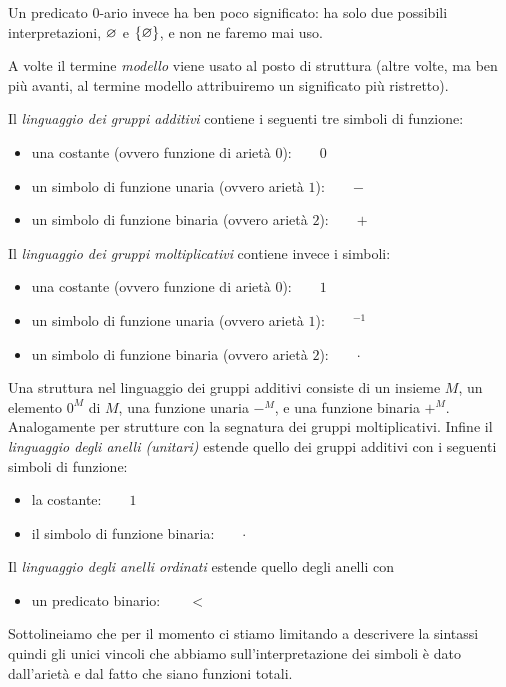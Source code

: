Un predicato $0$-ario invece ha ben poco significato: ha solo due possibili interpretazioni, $\varnothing$ e $\{\varnothing\}$, e non ne faremo mai uso.

A volte il termine \emph{modello\/} viene usato al posto di struttura (altre volte, ma ben pi\`u avanti, al termine modello attribuiremo un significato pi\`u ristretto).

\begin{example}\label{LgaLgmLau}
Il \emph{linguaggio dei gruppi additivi\/} contiene i seguenti tre simboli di funzione:
\begin{itemize}
\item una costante (ovvero funzione di ariet\`a $0$):\ \ \ \  $0$
\item un simbolo di funzione unaria (ovvero ariet\`a $1$):\ \ \ \   $-$
\item un simbolo di funzione binaria (ovvero ariet\`a $2$):\ \ \ \  $+$
\end{itemize}
Il \emph{linguaggio dei gruppi moltiplicativi\/}  contiene invece i simboli:
\begin{itemize}
\item una costante (ovvero funzione di ariet\`a $0$):\ \ \ \  $1$
\item un simbolo di funzione unaria (ovvero ariet\`a $1$):\ \ \ \   ${}^{-1}$
\item un simbolo di funzione binaria (ovvero ariet\`a $2$):\ \ \ \  $\cdot$
\end{itemize}
Una struttura nel linguaggio dei gruppi additivi consiste di un insieme $M$, un elemento $0^M$ di $M$, una funzione unaria $-^M$, e una funzione binaria $+^M$. Analogamente per strutture con la segnatura dei gruppi moltiplicativi. Infine il \emph{linguaggio degli anelli (unitari)\/} estende quello dei gruppi additivi con i seguenti simboli di funzione:
\begin{itemize}
\item la costante:\ \ \ \  $1$
\item il simbolo di funzione binaria:\ \ \ \  $\cdot$
\end{itemize}
Il \emph{linguaggio degli anelli ordinati\/} estende quello degli anelli con\nobreak 
\begin{itemize}
\item un predicato binario:\ \ \ \  $<$
\end{itemize}
Sottolineiamo che per il momento ci stiamo limitando a descrivere la sintassi quindi gli unici vincoli che abbiamo sull'interpretazione dei simboli \`e dato dall'ariet\`a e dal fatto che siano funzioni totali.
\end{example}


